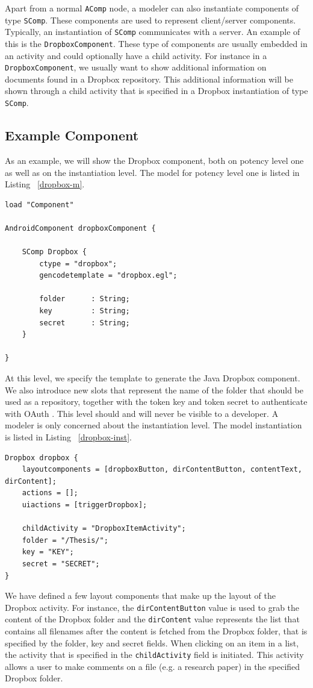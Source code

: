 Apart from a normal \texttt{AComp} node, a modeler can also instantiate components of type \texttt{SComp}. These components are used to represent client/server components. Typically, an instantiation of \texttt{SComp} communicates with a server. An example of this is the \texttt{DropboxComponent}. These type of components are usually embedded in an activity and could optionally have a child activity. For instance in a \texttt{DropboxComponent}, we usually want to show additional information on documents found in a Dropbox repository. This additional information will be shown through a child activity that is specified in a Dropbox instantiation of type \texttt{SComp}. \\

\subsection{Example Component}

As an example, we will show the Dropbox component, both on potency level one as well as on the instantiation level. The model for potency level one is listed in Listing ~\ref{dropbox-m}.

\begin{lstlisting}[label=dropbox-m,caption=Dropbox model, captionpos=t]
load "Component"

AndroidComponent dropboxComponent {
	
	SComp Dropbox {
		ctype = "dropbox";
		gencodetemplate = "dropbox.egl";

		folder 		: String;
		key 		: String;
		secret 		: String;
	}

}
\end{lstlisting}
At this level, we specify the template to generate the Java Dropbox component. We also introduce new slots that represent the name of the folder that should be used as a repository, together with the token key and token secret to authenticate with OAuth \cite{OAuth}. This level should and will never be visible to a developer. A modeler is only concerned about the instantiation level. The model instantiation is listed in Listing ~\ref{dropbox-inst}.

\begin{lstlisting}[label=dropbox-inst,caption=Dropbox instantiation, captionpos=t]
Dropbox dropbox {
	layoutcomponents = [dropboxButton, dirContentButton, contentText, dirContent];
	actions = [];
	uiactions = [triggerDropbox];

	childActivity = "DropboxItemActivity";
	folder = "/Thesis/";
	key = "KEY";
	secret = "SECRET";
}
\end{lstlisting}
We have defined a few layout components that make up the layout of the Dropbox activity. For instance, the \texttt{dirContentButton} value is used to grab the content of the Dropbox folder and the \texttt{dirContent} value represents the list that contains all filenames after the content is fetched from the Dropbox folder, that is specified by the folder, key and secret fields. When clicking on an item in a list, the activity that is specified in the \texttt{childActivity} field is initiated. This activity allows a user to make comments on a file (e.g. a research paper) in the specified Dropbox folder.

